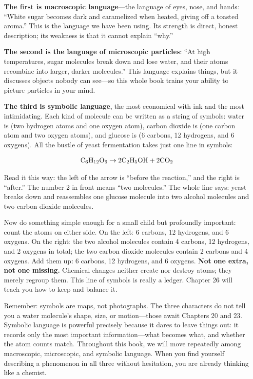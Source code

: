 \textbf{The first is macroscopic language}---the language of eyes, nose, and hands: ``White sugar becomes dark and caramelized when heated, giving off a toasted aroma.'' This is the language we have been using. Its strength is direct, honest description; its weakness is that it cannot explain ``why.''

\textbf{The second is the language of microscopic particles}: ``At high temperatures, sugar molecules break down and lose water, and their atoms recombine into larger, darker molecules.'' This language explains things, but it discusses objects nobody can see---so this whole book trains your ability to picture particles in your mind.

\textbf{The third is symbolic language}, the most economical with ink and the most intimidating. Each kind of molecule can be written as a string of symbols: water is  (two hydrogen atoms and one oxygen atom), carbon dioxide is  (one carbon atom and two oxygen atoms), and glucose is  (6 carbons, 12 hydrogens, and 6 oxygens). All the bustle of yeast fermentation takes just one line in symbols:

\[\mathrm{C_6H_{12}O_6} \rightarrow 2\mathrm{C_2H_5OH} + 2\mathrm{CO_2}\]

Read it this way: the left of the arrow is ``before the reaction,'' and the right is ``after.'' The number 2 in front means ``two molecules.'' The whole line says: yeast breaks down and reassembles one glucose molecule into two alcohol molecules and two carbon dioxide molecules.

Now do something simple enough for a small child but profoundly important: count the atoms on either side. On the left: 6 carbons, 12 hydrogens, and 6 oxygens. On the right: the two alcohol molecules contain 4 carbons, 12 hydrogens, and 2 oxygens in total; the two carbon dioxide molecules contain 2 carbons and 4 oxygens. Add them up: 6 carbons, 12 hydrogens, and 6 oxygens. \textbf{Not one extra, not one missing.} Chemical changes neither create nor destroy atoms; they merely regroup them. This line of symbols is really a ledger. Chapter 26 will teach you how to keep and balance it.

Remember: symbols are maps, not photographs. The three characters  do not tell you a water molecule's shape, size, or motion---those await Chapters 20 and 23. Symbolic language is powerful precisely because it dares to leave things out: it records only the most important information---what becomes what, and whether the atom counts match. Throughout this book, we will move repeatedly among macroscopic, microscopic, and symbolic language. When you find yourself describing a phenomenon in all three without hesitation, you are already thinking like a chemist.

